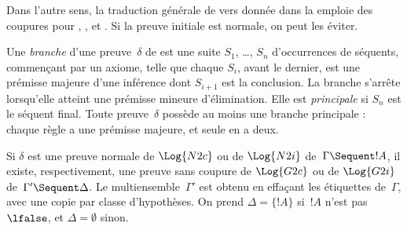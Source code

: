 \documentclass[../../../include/open-logic-section]{subfiles}
\begin{document}
Dans l'autre sens, la traduction générale
de  vers  donnée dans la
 emploie
des coupures pour \Elim{\land},
\Elim{\lif}, \Elim{\lnot} et
\Elim{\lforall}. Si la preuve initiale
est normale, on peut les éviter.

Une \emph{branche} d'une preuve~$\delta$
de  est une suite $S_1$, \dots,
$S_n$ d'occurrences de séquents,
commençant par un axiome, telle que
chaque $S_i$, avant le dernier, est
une prémisse majeure d'une inférence
dont $S_{i+1}$ est la conclusion.
La branche s'arrête lorsqu'elle atteint
une prémisse mineure d'élimination.
Elle est \emph{principale} si $S_n$
est le séquent final.
Toute preuve~$\delta$ possède au moins
une branche principale : chaque règle
a une prémisse majeure, et seule
\Intro{\land} en a deux.

\begin{prop}
Si $\delta$ est une preuve normale
de $\Log{N2c}$ ou de $\Log{N2i}$
de~$\Gamma \Sequent !A$, il existe,
respectivement, une preuve sans coupure
de $\Log{G2c}$ ou de $\Log{G2i}$
de~$\Gamma' \Sequent \Delta$.
Le multiensemble~$\Gamma'$ est obtenu
en effaçant les étiquettes de~$\Gamma$,
avec une copie par classe d'hypothèses.
On prend $\Delta = \{!A\}$ si~$!A$
n'est pas~$\lfalse$, et
$\Delta = \emptyset$ sinon.
\end{prop}
\end{document}
